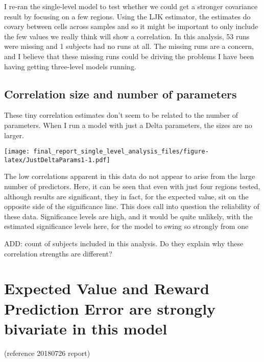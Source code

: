 \documentclass[]{article}
\begin{document}
I re-ran the single-level model to test whether we could get a stronger
covariance result by focusing on a few regions. Using the LJK estimator,
the estimates do covary between cells across samples and so it might be
important to only include the few values we really think will show a
correlation. In this analysis, 53 runs were missing and 1 subjects had
no runs at all. The missing runs are a concern, and I believe that these
missing runs could be driving the problems I have been having getting
three-level models running.

\subsection{Correlation size and number of
parameters}\label{correlation-size-and-number-of-parameters}

These tiny correlation estimates don't seem to be related to the number
of parameters. When I run a model with just a Delta parameters, the
sizes are no larger.

\texttt{[image: final\_report\_single\_level\_analysis\_files/figure-latex/JustDeltaParams1-1.pdf]}

The low correlations apparent in this data do not appear to arise from
the large number of predictors. Here, it can be seen that even with just
four regions tested, although results are significant, they in fact, for
the expected value, sit on the opposite side of the significance line.
This does call into question the reliability of these data. Significance
levels are high, and it would be quite unlikely, with the estimated
significance levels here, for the model to swing so strongly from one

ADD: count of subjects included in this analysis. Do they explain why
these correlation strengths are different?

\section{Expected Value and Reward Prediction Error are strongly
bivariate in this
model}\label{expected-value-and-reward-prediction-error-are-strongly-bivariate-in-this-model}

(reference 20180726 report)
\end{document}

